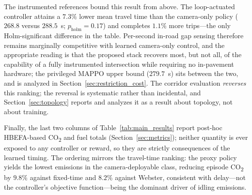 The instrumented references bound this result from above. The loop-actuated controller
attains a $7.3\%$ lower mean travel time than the camera-only policy ($268.8$ versus
$288.5$~s; $p_{\mathrm{holm}} = 0.17$) and completes $1.1\%$ more trips---the only
Holm-significant difference in the table. Per-second in-road gap sensing therefore remains
marginally competitive with learned camera-only control, and the appropriate reading is that
the proposed stack recovers most, but not all, of the capability of a fully instrumented
intersection while requiring no in-pavement hardware; the privileged MAPPO upper bound
($279.7$~s) sits between the two, and is analyzed in Section~\ref{sec:restriction_cost}. The
corridor evaluation \emph{reverses} this ranking; the reversal is systematic rather than
incidental, and Section~\ref{sec:topology} reports and analyzes it as a result about
topology, not about training.

\label{sec:emissions}%
Finally, the last two columns of Table~\ref{tab:main_results} report post-hoc HBEFA-based
CO\textsubscript{2} and fuel totals (Section~\ref{sec:metrics}); neither quantity is ever
exposed to any controller or reward, so they are strictly consequences of the learned
timing. The ordering mirrors the travel-time ranking: the proxy policy yields the lowest
emissions in the camera-deployable class, reducing episode CO\textsubscript{2} by $9.8\%$
against fixed-time and $8.2\%$ against Webster, consistent with delay---not the
controller's objective function---being the dominant driver of idling emissions.

